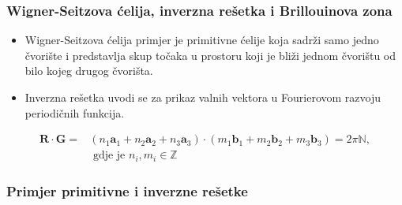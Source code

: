 \documentclass{beamer}
\begin{document}
\begin{frame}
\frametitle{Wigner-Seitzova ćelija, inverzna rešetka i Brillouinova zona}
\begin{itemize}
	\item Wigner-Seitzova ćelija primjer je primitivne ćelije koja sadrži samo
		jedno čvorište i predstavlja skup točaka u prostoru koji je bliži jednom
		čvorištu od bilo kojeg drugog čvorišta.
	\item Inverzna rešetka uvodi se za prikaz valnih vektora u Fourierovom
		razvoju periodičnih funkcija.
\end{itemize}
	\begin{align}
		\mathbf{R} \cdot \mathbf{G} =&
	(n_1\mathbf{a}_1 + n_2\mathbf{a}_2 + n_3\mathbf{a}_3)
	\cdot
	(m_1\mathbf{b}_1 + m_2\mathbf{b}_2 + m_3\mathbf{b}_3) = 2 \pi \mathbb{N},
		\nonumber \\
		&\text{ gdje je }n_i, m_i \in \mathbb{Z}
	\end{align}
\end{frame}

\begin{frame}
	\frametitle{Primjer primitivne i inverzne rešetke}
	\begin{figure}[ht]
	\centering
    	\qquad
		\label{fig:square_lattice}
	\end{figure}
\end{frame}
\end{document}
